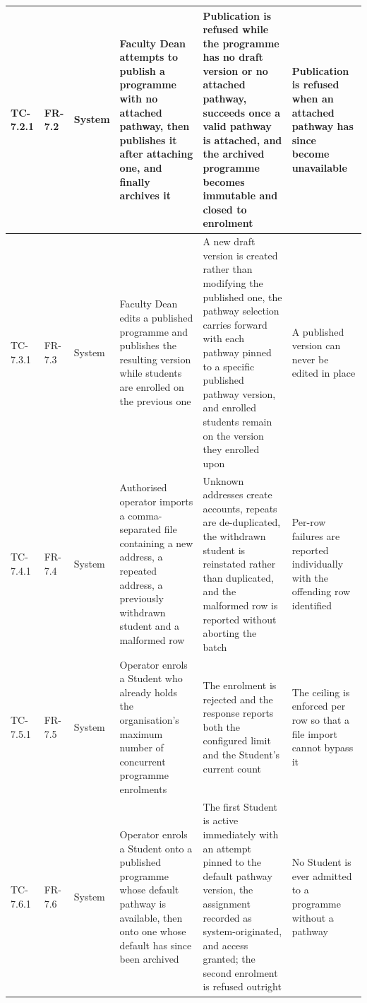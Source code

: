 \begin{longtable}{|>{\centering\arraybackslash}m{}|>{\centering\arraybackslash}m{}|>{\centering\arraybackslash}m{}|m{}|m{}|m{}|}
TC-7.2.1 & FR-7.2 & System & Faculty Dean attempts to publish a programme with no attached pathway, then publishes it after attaching one, and finally archives it & Publication is refused while the programme has no draft version or no attached pathway, succeeds once a valid pathway is attached, and the archived programme becomes immutable and closed to enrolment & Publication is refused when an attached pathway has since become unavailable \\ \hline

TC-7.3.1 & FR-7.3 & System & Faculty Dean edits a published programme and publishes the resulting version while students are enrolled on the previous one & A new draft version is created rather than modifying the published one, the pathway selection carries forward with each pathway pinned to a specific published pathway version, and enrolled students remain on the version they enrolled upon & A published version can never be edited in place \\ \hline

TC-7.4.1 & FR-7.4 & System & Authorised operator imports a comma-separated file containing a new address, a repeated address, a previously withdrawn student and a malformed row & Unknown addresses create accounts, repeats are de-duplicated, the withdrawn student is reinstated rather than duplicated, and the malformed row is reported without aborting the batch & Per-row failures are reported individually with the offending row identified \\ \hline

TC-7.5.1 & FR-7.5 & System & Operator enrols a Student who already holds the organisation's maximum number of concurrent programme enrolments & The enrolment is rejected and the response reports both the configured limit and the Student's current count & The ceiling is enforced per row so that a file import cannot bypass it \\ \hline

TC-7.6.1 & FR-7.6 & System & Operator enrols a Student onto a published programme whose default pathway is available, then onto one whose default has since been archived & The first Student is active immediately with an attempt pinned to the default pathway version, the assignment recorded as system-originated, and access granted; the second enrolment is refused outright & No Student is ever admitted to a programme without a pathway \\ \hline


\end{longtable}
